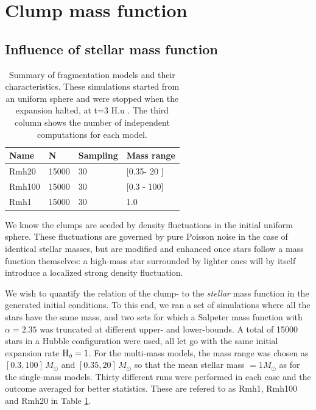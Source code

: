    
   
   
\section{Clump mass function}





\subsection{Influence of stellar mass function}
\label{Sub:2_ClumpMF_MF}





\begin{table}
\begin{center}
\caption{Summary of fragmentation models and their characteristics. These simulations started from an uniform sphere and were stopped when the expansion halted, at t=3 H.u . The third column shows the number of independent computations for each model.}
\label{Tab:2_fragmentationmodels}
\begin{tabularx}{0.7\textwidth}{XXXX}
\hline
Name & N & Sampling & Mass range  \\
\hline
Rmh20 & 15000 & 30 & [0.35- 20 ]\\
Rmh100 & 15000 & 30 & [0.3 - 100]\\
Rmh1 & 15000 & 30 & 1.0 \\
\hline
\end{tabularx}
\end{center}
\end{table}



We know the clumps are seeded by density fluctuations in the initial uniform sphere. These fluctuations are governed by pure Poisson noise in the case of identical stellar masses, but are modified and enhanced once stars follow a mass function themselves: a high-mass star surrounded by lighter ones will by itself introduce a localized strong density fluctuation.

We wish to quantify the relation of the clump- to  the {\it stellar} mass function in the generated initial conditions. To this end, we ran a set of simulations where all the stars have the same mass, and two sets for which a Salpeter mass function with $\alpha = 2.35$  was truncated at different upper- and lower-bounds. A total of 15000 stars in a Hubble configuration were used, all let go  with the same initial expansion rate  ${\textrm{H}}_o = 1$. For the multi-mass models, the mass range  was chosen as $[0.3, 100]\, M_\odot$ and $[0.35, 20]\, M_\odot$ so that the mean stellar mass $= 1M_\odot$ as for the single-mass models. Thirty different runs were performed in each case and the outcome averaged for better statistics. These are refered to as Rmh1, Rmh100 and Rmh20 in Table \ref{Tab:2_fragmentationmodels}.

